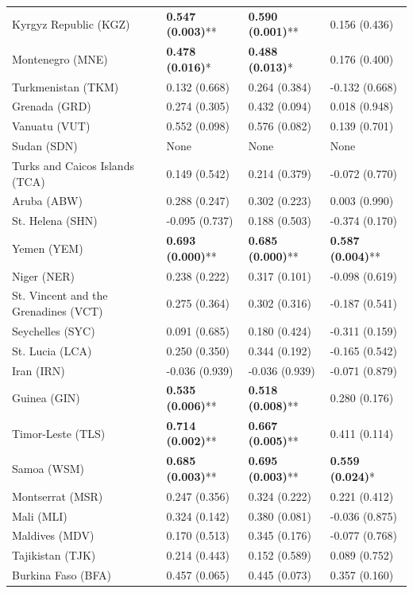 \begin{longtable}{p{4cm}p{3cm}p{3cm}p{3cm}}
Kyrgyz Republic (KGZ) & \textbf{0.547 (0.003)}** & \textbf{0.590 (0.001)}** & 0.156 (0.436) \\
Montenegro (MNE) & \textbf{0.478 (0.016)}* & \textbf{0.488 (0.013)}* & 0.176 (0.400) \\
Turkmenistan (TKM) & 0.132 (0.668) & 0.264 (0.384) & -0.132 (0.668) \\
Grenada (GRD) & 0.274 (0.305) & 0.432 (0.094) & 0.018 (0.948) \\
Vanuatu (VUT) & 0.552 (0.098) & 0.576 (0.082) & 0.139 (0.701) \\
Sudan (SDN) & None & None & None \\
Turks and Caicos Islands (TCA) & 0.149 (0.542) & 0.214 (0.379) & -0.072 (0.770) \\
Aruba (ABW) & 0.288 (0.247) & 0.302 (0.223) & 0.003 (0.990) \\
St. Helena (SHN) & -0.095 (0.737) & 0.188 (0.503) & -0.374 (0.170) \\
Yemen (YEM) & \textbf{0.693 (0.000)}** & \textbf{0.685 (0.000)}** & \textbf{0.587 (0.004)}** \\
Niger (NER) & 0.238 (0.222) & 0.317 (0.101) & -0.098 (0.619) \\
St. Vincent and the Grenadines (VCT) & 0.275 (0.364) & 0.302 (0.316) & -0.187 (0.541) \\
Seychelles (SYC) & 0.091 (0.685) & 0.180 (0.424) & -0.311 (0.159) \\
St. Lucia (LCA) & 0.250 (0.350) & 0.344 (0.192) & -0.165 (0.542) \\
Iran (IRN) & -0.036 (0.939) & -0.036 (0.939) & -0.071 (0.879) \\
Guinea (GIN) & \textbf{0.535 (0.006)}** & \textbf{0.518 (0.008)}** & 0.280 (0.176) \\
Timor-Leste (TLS) & \textbf{0.714 (0.002)}** & \textbf{0.667 (0.005)}** & 0.411 (0.114) \\
Samoa (WSM) & \textbf{0.685 (0.003)}** & \textbf{0.695 (0.003)}** & \textbf{0.559 (0.024)}* \\
Montserrat (MSR) & 0.247 (0.356) & 0.324 (0.222) & 0.221 (0.412) \\
Mali (MLI) & 0.324 (0.142) & 0.380 (0.081) & -0.036 (0.875) \\
Maldives (MDV) & 0.170 (0.513) & 0.345 (0.176) & -0.077 (0.768) \\
Tajikistan (TJK) & 0.214 (0.443) & 0.152 (0.589) & 0.089 (0.752) \\
Burkina Faso (BFA) & 0.457 (0.065) & 0.445 (0.073) & 0.357 (0.160) \\

\end{longtable}
